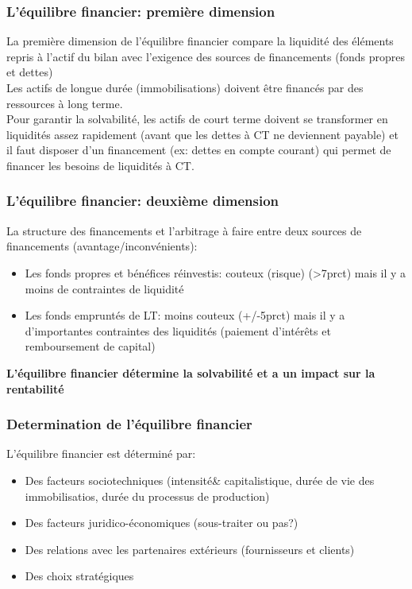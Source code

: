\documentclass{article}
\begin{document}
\subsubsection*{L'équilibre financier: première dimension}
La première dimension de l'équilibre financier compare la liquidité des éléments repris à l'actif du bilan avec l'exigence des sources de financements (fonds propres et dettes) \\
Les actifs de longue durée (immobilisations) doivent être financés par des ressources à long terme. \\
Pour garantir la solvabilité, les actifs de court terme doivent se transformer en liquidités assez rapidement (avant que les dettes à CT ne deviennent payable) et il faut disposer d'un financement (ex: dettes en compte courant) qui permet de financer les besoins de liquidités à CT. 

\subsubsection*{L'équilibre financier: deuxième dimension}
La structure des financements et l'arbitrage à faire entre deux sources de financements (avantage/inconvénients):
\begin{itemize}
    \item Les fonds propres et bénéfices réinvestis: couteux (risque) (>7prct) mais il y a moins de contraintes de liquidité
    \item Les fonds empruntés de LT: moins couteux (+/-5prct) mais il y a d'importantes contraintes des liquidités (paiement d'intérêts et remboursement de capital)
\end{itemize}
\textbf{L’équilibre financier détermine la solvabilité et a un impact sur la rentabilité}

\subsubsection*{Determination de l'équilibre financier}
L'équilibre financier est déterminé par:
\begin{itemize}
    \item Des facteurs sociotechniques (intensité& capitalistique, durée de vie des immobilisatios, durée du processus de production)
    \item Des facteurs juridico-économiques (sous-traiter ou pas?)
    \item Des relations avec les partenaires extérieurs (fournisseurs et clients)
    \item Des choix stratégiques
\end{itemize}
\end{document}
